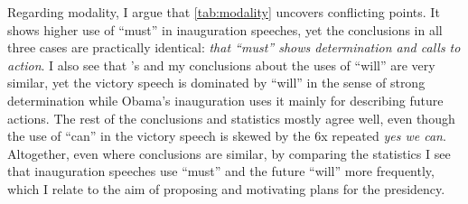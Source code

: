 \documentclass[11pt]{article}
\begin{document}
{	%
	
	Regarding modality, I argue that \autoref{tab:modality} uncovers conflicting points. It shows higher use of ``must'' in inauguration speeches, yet the conclusions in all three cases are practically identical: \textit{that ``must'' shows determination and calls to action}.
	I also see that \citeauthor{Ye}'s and my conclusions about the uses of ``will'' are very similar, yet the victory speech is dominated by ``will'' in the sense of strong determination while Obama's inauguration uses it mainly for describing future actions.
	The rest of the conclusions and statistics mostly agree well, even though the use of ``can'' in the victory speech is skewed by the 6x repeated \textit{yes we can}.
	Altogether, even where conclusions are similar, by comparing the statistics I see that inauguration speeches use ``must'' and the future ``will'' more frequently, which I relate to the aim of proposing and motivating plans for the presidency. 


}
\end{document}
